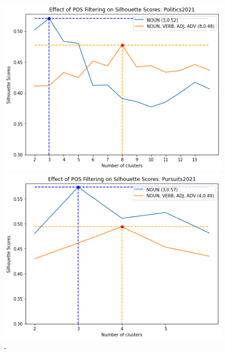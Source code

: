 \begin{figure}[H]
\begin{minipage}[t]{.35\textwidth}
    \includegraphics[width=\linewidth]{images/eval/politics2021_sil.png}
    \caption{-}
    \label{fig:pos_politics2021}
  \end{minipage}
  \begin{minipage}[t]{.35\textwidth}
    \centering
    \includegraphics[width=\linewidth]{images/eval/pursuits2021_sil.png}
    \caption{-}
    \label{fig:pos_pursuit2021}
  \end{minipage}
\end{figure}

